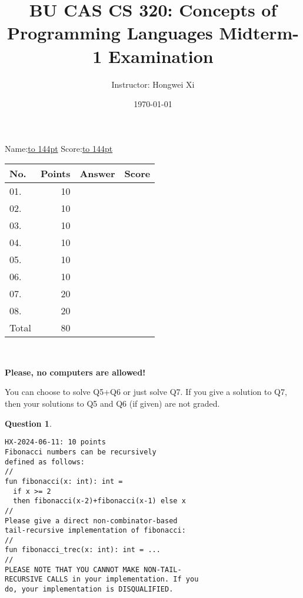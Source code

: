 \documentclass[12pt,fullpage]{article}
\title{\LARGE\bf BU CAS CS 320: Concepts of Programming Languages\break\break
Midterm-1 Examination}
\author{Instructor: Hongwei Xi}
\date{\today}
\newtheorem{question}[lemma]{Question}
\begin{document}
\maketitle

\def\exp#1{\mbox{\tt #1}}
\def\val#1{\mbox{\it #1}}
\def\mark{\mbox{$\star$}}

\noindent
Name:\underline{\hbox to 144pt{\hss}}
\hfill
Score:\underline{\hbox to 144pt{\hss}}

\vspace{12pt}
\begin{center}
\Large
\begin{tabular}{l|r|r|p{36pt}}
No. & Points & Answer & Score \\ \hline \hline
01. & 10 & & \\ \hline
02. & 10 & & \\ \hline
03. & 10 & & \\ \hline
04. & 10 & & \\ \hline
05. & 10 & & \\ \hline
06. & 10 & & \\ \hline
07. & 20 & & \\ \hline
08. & 20 & & \\ \hline

Total & 80 & & \\ \hline \hline

\end{tabular} \\[24pt]
\end{center}
\vfill\newpage

\begin{center}
{\huge\bf Please, no computers are allowed!} \\[12pt]
\end{center}
\noindent
You can choose to solve Q5+Q6 or just solve Q7. If
you give a solution to Q7, then your solutions to Q5 and Q6
(if given) are not graded.

\begin{question}~~
\begin{verbatim}
HX-2024-06-11: 10 points
Fibonacci numbers can be recursively
defined as follows:
//
fun fibonacci(x: int): int =
  if x >= 2
  then fibonacci(x-2)+fibonacci(x-1) else x
//
Please give a direct non-combinator-based
tail-recursive implementation of fibonacci:
//
fun fibonacci_trec(x: int): int = ...
//
PLEASE NOTE THAT YOU CANNOT MAKE NON-TAIL-
RECURSIVE CALLS in your implementation. If you
do, your implementation is DISQUALIFIED.
\end{verbatim}
\end{question}
\end{document}
